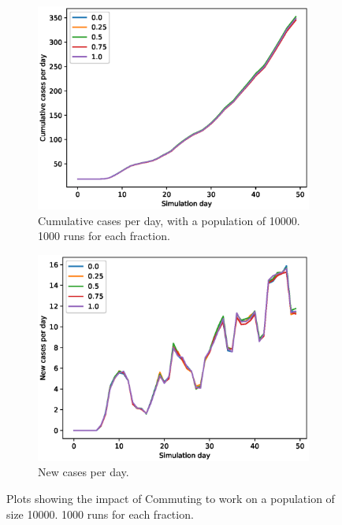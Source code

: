 \documentclass[runningheads]{llncs}
\begin{document}
\begin{figure}[h!]
	\centering
	\begin{subfigure}[b]{0.7\linewidth}
		\includegraphics[width=\textwidth]{work_cum_1.eps}
		\caption{Cumulative cases per day, with a population of 10000. 1000 runs for each fraction.} 
	\end{subfigure}
	\begin{subfigure}[b]{0.7\linewidth}
		\includegraphics[width=\textwidth]{work_cases_per_day_1.eps}
		\caption{New cases per day.} 
	\end{subfigure}
	\caption{Plots showing the impact of Commuting to work on a population of size 10000. 1000 runs for each fraction. }
	\label{VaccinePlot}
\end{figure}
\end{document}
